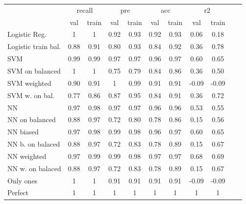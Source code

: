 \documentclass[12pt]{article}
\begin{document}
        \begin{table}[ht!]
            \centering
            \begin{tabular}{lcccccccccc}
        \toprule
                              &\multicolumn{2}{c}{recall} & \multicolumn{2}{c}{pre} & \multicolumn{2}{c}{acc} & \multicolumn{2}{c}{r2} \\
                              &val         & train        & val       & train       & val       & train       & val       & train      \\
        \midrule               
        Logistic Reg.         & 1          & 1            & 0.92      & 0.93        & 0.92      & 0.93        & 0.06      & 0.18       \\ 
        Logistic train bal.   & 0.88       & 0.91         & 0.80      & 0.93        & 0.84      & 0.92        & 0.36      & 0.78       \\   
        SVM                   & 0.99       & 0.99         & 0.97      & 0.97        & 0.96      & 0.97        & 0.60      & 0.65       \\   
        SVM on balanced       & 1          & 1            & 0.75      & 0.79        & 0.84      & 0.86        & 0.36      & 0.50       \\   
        SVM weighted          & 0.90       & 0.91         & 1         & 0.99        & 0.91      & 0.91        &-0.09      &-0.09       \\   
        SVM w. on bal.        & 0.77       & 0.86         & 0.87      & 0.95        & 0.84      & 0.91        & 0.36      & 0.72       \\  
        NN                    & 0.97       & 0.98         & 0.97      & 0.97        & 0.96      & 0.96        & 0.53      & 0.55       \\  
        NN on balanced        & 0.88       & 0.97         & 0.72      & 0.80        & 0.78      & 0.86        & 0.15      & 0.56       \\  
        NN biased             & 0.97       & 0.98         & 0.99      & 0.98        & 0.96      & 0.97        & 0.60      & 0.65       \\  
        NN b. on balaced      & 0.88       & 0.97         & 0.72      & 0.83        & 0.78      & 0.89        & 0.15      & 0.67       \\  
        NN weighted           & 0.97       & 0.99         & 0.99      & 0.98        & 0.97      & 0.97        & 0.68      & 0.69       \\  
        NN w. on balaced      & 0.88       & 0.97         & 0.72      & 0.83        & 0.78      & 0.89        & 0.15      & 0.67       \\  
        Only ones             & 1          & 1            & 0.91      & 0.91        & 0.91      & 0.91        &-0.09      &-0.09       \\
        Perfect               & 1          & 1            & 1         & 1           & 1         & 1           &1          & 1          \\
        
        \bottomrule
                \end{tabular}
        \end{table}
\end{document}
